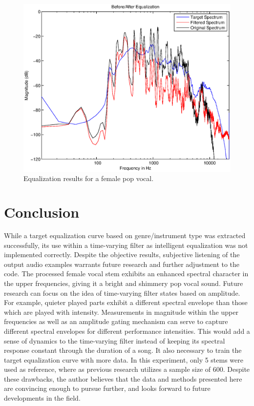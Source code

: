 \documentclass{article}
\begin{document}
\begin{figure}[htbp]
\centering
\includegraphics[width=0.9\columnwidth]{vocalresults.eps}
\caption{Equalization results for a female pop vocal.}
\label{fig:vocal}
\end{figure}


\section{Conclusion}
\label{sec:Results}

While a target equalization curve based on genre/instrument type was extracted successfully, its use within a time-varying filter as intelligent equalization was not implemented correctly.  Despite the objective results, subjective listening of the output audio examples warrants future research and further adjustment to the code.  The processed female vocal stem exhibits an enhanced spectral character in the upper frequencies, giving it a bright and shimmery pop vocal sound.  Future research can focus on the idea of time-varying filter states based on amplitude.  For example, quieter played parts exhibit a different spectral envelope than those which are played with intensity.  Measurements in magnitude within the upper frequencies as well as an amplitude gating mechanism can serve to capture different spectral envelopes for different performance intensities.  This would add a sense of dynamics to the time-varying filter instead of keeping its spectral response constant through the duration of a song.  It also necessary to train the target equalization curve with more data.  In this experiment, only 5 stems were used as reference, where as previous research utilizes a sample size of 600.  Despite these drawbacks, the author believes that the data and methods presented here are convincing enough to pursue further, and looks forward to future developments in the field.
\end{document}
